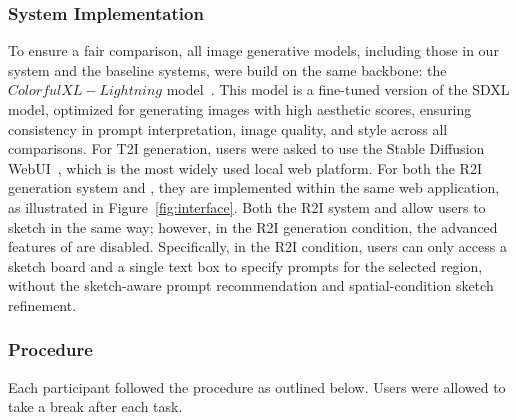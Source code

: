 \subsubsection{System Implementation}
To ensure a fair comparison, all image generative models, including those in our system and the baseline systems, were build on the same backbone: the $ColorfulXL-Lightning$ model~\cite{colorful}. 
This model is a fine-tuned version of the SDXL model, optimized for generating images with high aesthetic scores, ensuring consistency in prompt interpretation, image quality, and style across all comparisons.
For T2I generation, users were asked to use the Stable Diffusion WebUI~\cite{sd}, which is the most widely used local web platform.
For both the R2I generation system and \tool, they are implemented within the same web application, as illustrated in Figure~\ref{fig:interface}. 
Both the R2I system and \tool allow users to sketch in the same way; however, in the R2I generation condition, the advanced features of \tool are disabled. 
Specifically, in the R2I condition, users can only access a sketch board and a single text box to specify prompts for the selected region, 
without the sketch-aware prompt recommendation and spatial-condition sketch refinement.



\subsubsection{Procedure}
Each participant followed the procedure as outlined below. Users were allowed to take a break after each task.

